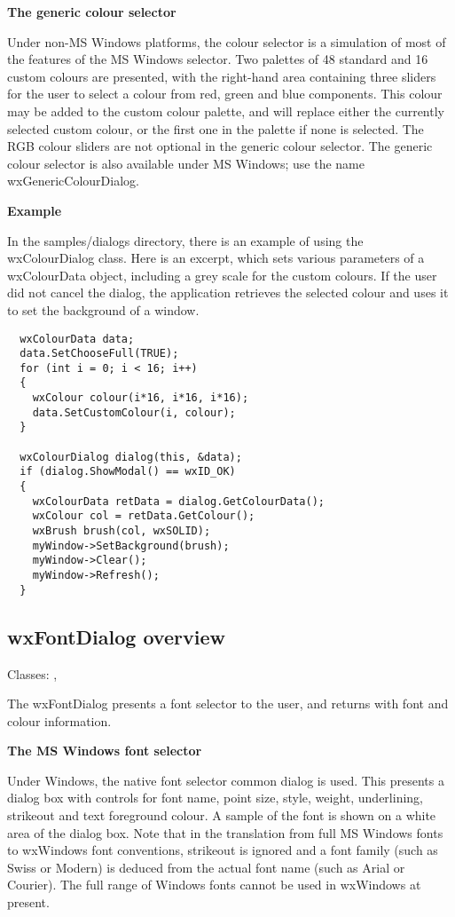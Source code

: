 {\bf The generic colour selector}

Under non-MS Windows platforms, the colour selector is a simulation of
most of the features of the MS Windows selector. Two palettes of 48
standard and 16 custom colours are presented, with the right-hand area
containing three sliders for the user to select a colour from red,
green and blue components. This colour may be added to the custom colour
palette, and will replace either the currently selected custom colour,
or the first one in the palette if none is selected. The RGB colour sliders
are not optional in the generic colour selector. The generic colour
selector is also available under MS Windows; use the name
wxGenericColourDialog.

{\bf Example}

In the samples/dialogs directory, there is an example of using
the wxColourDialog class. Here is an excerpt, which
sets various parameters of a wxColourData object, including
a grey scale for the custom colours. If the user did not cancel
the dialog, the application retrieves the selected colour and
uses it to set the background of a window.

\begin{verbatim}
  wxColourData data;
  data.SetChooseFull(TRUE);
  for (int i = 0; i < 16; i++)
  {
    wxColour colour(i*16, i*16, i*16);
    data.SetCustomColour(i, colour);
  }
      
  wxColourDialog dialog(this, &data);
  if (dialog.ShowModal() == wxID_OK)
  {
    wxColourData retData = dialog.GetColourData();
    wxColour col = retData.GetColour();
    wxBrush brush(col, wxSOLID);
    myWindow->SetBackground(brush);
    myWindow->Clear();
    myWindow->Refresh();
  }
\end{verbatim}


\subsection{wxFontDialog overview}\label{wxfontdialogoverview}

Classes: , 

The wxFontDialog presents a font selector to the user, and returns
with font and colour information.

{\bf The MS Windows font selector}

Under Windows, the native font selector common dialog is used. This
presents a dialog box with controls for font name, point size, style, weight,
underlining, strikeout and text foreground colour. A sample of the
font is shown on a white area of the dialog box. Note that
in the translation from full MS Windows fonts to wxWindows font
conventions, strikeout is ignored and a font family (such as
Swiss or Modern) is deduced from the actual font name (such as Arial
or Courier). The full range of Windows fonts cannot be used in wxWindows
at present.

